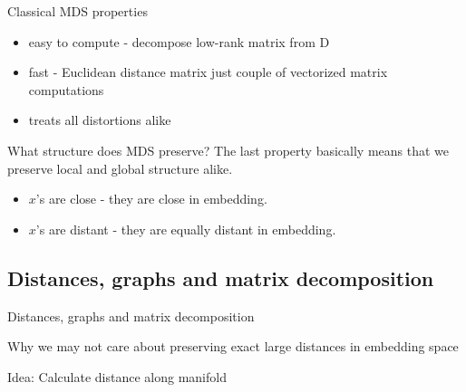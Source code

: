 \documentclass[unknownkeysallowed]{beamer}
\begin{document}
\begin{frame}{Classical MDS properties}

\begin{itemize}
    \item easy to compute - decompose low-rank matrix from D
    \item fast - Euclidean distance matrix just couple of vectorized matrix computations
    \item treats all distortions alike
\end{itemize}



\begin{block}{What structure does MDS preserve?}
The last property basically means that we preserve local and global structure alike.

\begin{itemize}
    \item $x$'s are close - they are close in embedding.
    \item $x$'s are distant - they are equally distant in embedding.
\end{itemize}

\end{block}
\end{frame}
\subsection{Distances, graphs and matrix decomposition}

\begin{frame}{Distances, graphs and matrix decomposition}

\begin{block}{Why we may not care about preserving exact large distances in embedding space}
\end{block}

Idea: Calculate distance along manifold

\end{frame}
\end{document}
